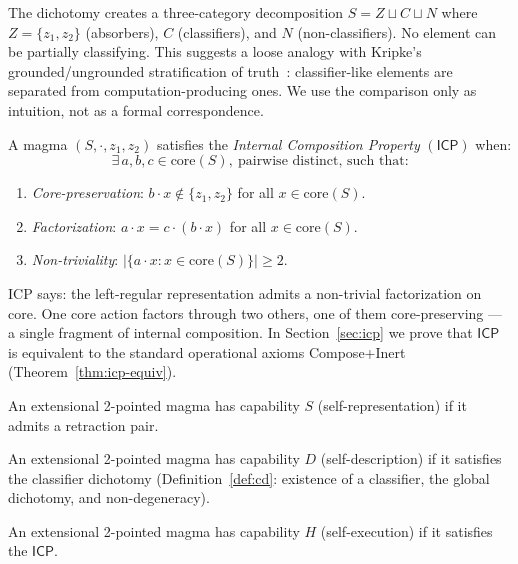 \documentclass[sigconf,screen,review,anonymous]{acmart}
\newcommand{\dotop}{\cdot}
\newcommand{\ICP}{\textsf{ICP}}
\newcommand{\core}{\mathrm{core}}
\begin{document}
The dichotomy creates a three-category decomposition $S = Z \sqcup C \sqcup N$ where $Z = \{z_1, z_2\}$ (absorbers), $C$ (classifiers), and $N$ (non-classifiers). No element can be partially classifying. This suggests a loose analogy with Kripke's grounded/ungrounded stratification of truth~\cite{kripke75}: classifier-like elements are separated from computation-producing ones. We use the comparison only as intuition, not as a formal correspondence.

\begin{definition}
\label{def:icp}
A magma $(S, \dotop, z_1, z_2)$ satisfies the \emph{Internal Composition Property} $(\ICP)$ when:
\[
\exists\, a, b, c \in \core(S),\ \text{pairwise distinct, such that:}
\]
\begin{enumerate}
  \item \emph{Core-preservation}: $b \dotop x \notin \{z_1, z_2\}$ for all $x \in \core(S)$.
  \item \emph{Factorization}: $a \dotop x = c \dotop (b \dotop x)$ for all $x \in \core(S)$.
  \item \emph{Non-triviality}: $|\{a \dotop x : x \in \core(S)\}| \geq 2$.
\end{enumerate}
\end{definition}

ICP says: the left-regular representation admits a non-trivial factorization on core. One core action factors through two others, one of them core-preserving — a single fragment of internal composition. In Section~\ref{sec:icp} we prove that $\ICP$ is equivalent to the standard operational axioms Compose+Inert (Theorem~\ref{thm:icp-equiv}).

\begin{definition}[Capability S]
An extensional 2-pointed magma has capability $S$ (self-representation) if it admits a retraction pair.
\end{definition}

\begin{definition}[Capability D]
An extensional 2-pointed magma has capability $D$ (self-description) if it satisfies the classifier dichotomy (Definition~\ref{def:cd}: existence of a classifier, the global dichotomy, and non-degeneracy).
\end{definition}

\begin{definition}[Capability H]
An extensional 2-pointed magma has capability $H$ (self-execution) if it satisfies the $\ICP$.
\end{definition}
\end{document}
